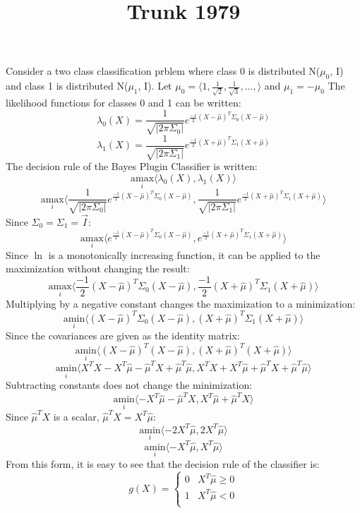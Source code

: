 \documentclass{article}
\title{Trunk 1979}
\begin{document}
  \maketitle
  Consider a two class classification prblem where class 0 is distributed N($\mu_0$, I) and class 1 is distributed N($\mu_1$, I).
  Let $\mu_0 = \langle 1, \frac{1}{\sqrt 2}, \frac{1}{\sqrt{3}}, ..., \rangle$ and $\mu_1 = -\mu_0$
  The likelihood functions for classes 0 and 1 can be written:
  $$\lambda_0(X) = \frac{1}{\sqrt{|2 \pi \Sigma_0|}}e^{\frac{-1}{2}(X - \hat \mu)^T\Sigma_0(X - \hat \mu)}$$
  $$\lambda_1(X) = \frac{1}{\sqrt{|2 \pi \Sigma_1|}}e^{\frac{-1}{2}(X + \hat \mu)^T\Sigma_1(X + \hat \mu)}$$
  The decision rule of the Bayes Plugin Classifier is written:
  $$\underset{i}{\text{amax}} \langle \lambda_0(X), \lambda_1(X) \rangle$$
  $$\underset{i}{\text{amax}} \langle \frac{1}{\sqrt{|2 \pi \Sigma_0|}}e^{\frac{-1}{2}(X - \hat \mu)^T\Sigma_0(X - \hat \mu)}, \frac{1}{\sqrt{|2 \pi \Sigma_1|}}e^{\frac{-1}{2}(X + \hat \mu)^T\Sigma_1(X + \hat \mu)} \rangle$$
  Since $\Sigma_0=\Sigma_1=\vec I$:
  $$\underset{i}{\text{amax}} \langle e^{\frac{-1}{2}(X - \hat \mu)^T\Sigma_0(X - \hat \mu)}, e^{\frac{-1}{2}(X + \hat \mu)^T\Sigma_1(X + \hat \mu)} \rangle$$
  Since $\ln$ is a monotonically increasing function, it can be applied to the maximization without changing the result:
  $$\underset{i}{\text{amax}} \langle \frac{-1}{2}(X - \hat \mu)^T\Sigma_0(X - \hat \mu), \frac{-1}{2}(X + \hat \mu)^T\Sigma_1(X + \hat \mu) \rangle$$
  Multiplying by a negative constant changes the maximization to a minimization:
  $$\underset{i}{\text{amin}} \langle (X - \hat \mu)^T\Sigma_0(X - \hat \mu), (X + \hat \mu)^T\Sigma_1(X + \hat \mu) \rangle$$
  Since the covariances are given as the identity matrix:
  $$\underset{i}{\text{amin}} \langle (X - \hat \mu)^T(X - \hat \mu), (X + \hat \mu)^T(X + \hat \mu) \rangle$$
  $$\underset{i}{\text{amin}} \langle X^TX - X^T \hat \mu - \hat \mu^T X + \hat \mu^T \hat \mu, X^TX + X^T \hat \mu + \hat \mu^T X  + \hat \mu^T \hat \mu \rangle$$
  Subtracting constants does not change the minimization:
  $$\underset{i}{\text{amin}} \langle  - X^T \hat \mu - \hat \mu^T X,  X^T \hat \mu + \hat \mu^T X \rangle$$
  Since $\hat \mu^TX$ is a scalar, $\hat \mu^TX = X^T \hat \mu$:
  $$\underset{i}{\text{amin}} \langle  - 2X^T \hat \mu, 2X^T \hat \mu \rangle$$
  $$\underset{i}{\text{amin}} \langle  - X^T \hat \mu, X^T \hat \mu \rangle$$
  From this form, it is easy to see that the decision rule of the classifier is:
  \[g(X) =
    \begin{cases}
       0 & X^T\hat \mu \geq 0\\
       1 & X^T\hat \mu < 0\\
    \end{cases}
  \]
\end{document}
